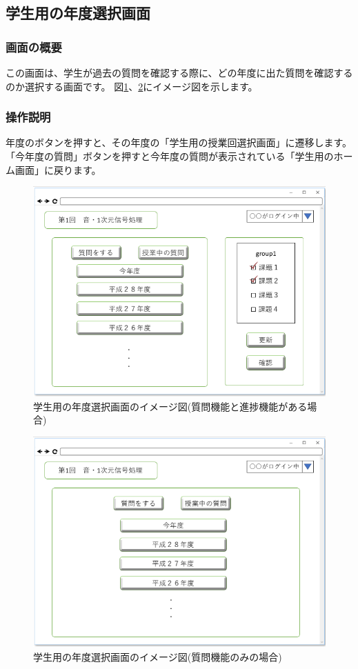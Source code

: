 \newpage

\subsection{学生用の年度選択画面}
\subsubsection{画面の概要}
この画面は、学生が過去の質問を確認する際に、どの年度に出た質問を確認するのか選択する画面です。
図\ref{fig:30}、\ref{fig:31}にイメージ図を示します。

\subsubsection{操作説明}
年度のボタンを押すと、その年度の「学生用の授業回選択画面」に遷移します。
「今年度の質問」ボタンを押すと今年度の質問が表示されている「学生用のホーム画面」に戻ります。

\begin{figure}[phtbp]
  \begin{center}
    \includegraphics[width=0.55\linewidth,clip]{./img/30.png}
    \caption{学生用の年度選択画面のイメージ図(質問機能と進捗機能がある場合)}\label{fig:30}
  \end{center}
\end{figure}

\begin{figure}[phtbp]
  \begin{center}
    \includegraphics[width=0.55\linewidth,clip]{./img/31.png}
    \caption{学生用の年度選択画面のイメージ図(質問機能のみの場合)}\label{fig:31}
  \end{center}
\end{figure}

